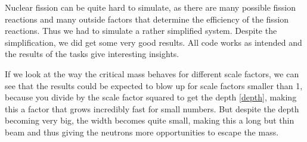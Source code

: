 Nuclear fission can be quite hard to simulate, as there are many possible fission reactions and many outside factors that determine the efficiency of the fission reactions. Thus we had to simulate a rather simplified system. Despite the simplification, we did get some very good results. All code works as intended and the results of the tasks give interesting insights.

If we look at the way the critical mass behaves for different scale factors, we can see that the results could be expected to blow up for scale factors smaller than 1, because you divide by the scale factor squared to get the depth \eqref{depth}, making this a factor that grows incredibly fast for small numbers. But despite the depth becoming very big, the width becomes quite small, making this a long but thin beam and thus giving the neutrons more opportunities to escape the mass.